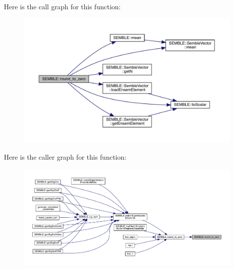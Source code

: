 Here is the call graph for this function\+:
\nopagebreak
\begin{figure}[H]
\begin{center}
\leavevmode
\includegraphics[width=350pt]{d7/dfd/namespaceSEMBLE_a0b915e7bcb9aa26f8723de8b033da4e0_cgraph}
\end{center}
\end{figure}
Here is the caller graph for this function\+:
\nopagebreak
\begin{figure}[H]
\begin{center}
\leavevmode
\includegraphics[width=350pt]{d7/dfd/namespaceSEMBLE_a0b915e7bcb9aa26f8723de8b033da4e0_icgraph}
\end{center}
\end{figure}
\mbox{\label{namespaceSEMBLE_a5f106e353054ed7ac809a9d21acdbd1c}} 
